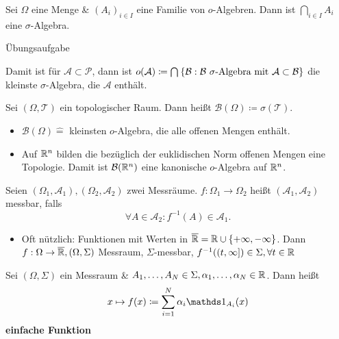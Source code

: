 \begin{lemma}
	Sei $ \Omega $ eine Menge \& $ \left( A_i \right) _{i \in I}  $ eine Familie von $ o $-Algebren.
	Dann ist $ \bigcap_{i \in  I} A_i $ eine $ \sigma $-Algebra.
\end{lemma}
\begin{proof*}
	Übungsaufgabe
\end{proof*}

Damit ist für $ \mathcal{A} \subset \mathcal{P}  $, dann ist $ o(\mathcal{A} ) \coloneqq \bigcap_{} \left\{ \mathcal{B} : \mathcal{B} \text{ $ \sigma $-Algebra mit $ \mathcal{A}  \subset \mathcal{B}  $}  \right\}  $ die kleinste $ \sigma $-Algebra, die $ \mathcal{A}  $ enthält.

\begin{definition}
	Sei $ (\Omega, \mathcal{T} ) $ ein topologischer Raum. Dann heißt $ \mathcal{B} (\Omega) \coloneqq \sigma(\mathcal{T} ) $.
	\begin{itemize}
		\item $ \mathcal{B} (\Omega) \hat{=}  $ kleinsten $ o $-Algebra, die alle offenen Mengen enthält.
		\item Auf $ \mathbb{R} ^n $ bilden die bezüglich der euklidischen Norm offenen Mengen eine Topologie.
			Damit ist $ \mathcal{B} (\mathbb{R} ^n) $ eine kanonische $ o $-Algebra auf $ \mathbb{R} ^n $.
	\end{itemize}
\end{definition}

\begin{definition}
	Seien $ (\Omega_1, \mathcal{A}_1 ), (\Omega_2, \mathcal{A} _2) $ zwei Messräume.
	$ f : \Omega_1 \to \Omega_2 $ heißt $ (\mathcal{A} _1, \mathcal{A} _2) $ messbar, falls
	\[
		\forall A \in \mathcal{A} _2 : f^{-1} (A) \in \mathcal{A} _1.
	\]
	\begin{itemize}
		\item Oft nützlich: Funktionen mit Werten in $ \overline{\mathbb{R} } = \mathbb{R}  \cup \left\{ + \infty, - \infty \right\}  $.
			Dann $ f : \Omega \to \overline{\mathbb{R} }, (\Omega, \Sigma ) $ Messraum,
			$ \Sigma $-messbar, $ f^{-1} ((t, \infty]) \in \Sigma , \forall t \in \mathbb{R}  $
	\end{itemize}
\end{definition}

\begin{example}
	Sei $ (\Omega, \Sigma) $ ein Messraum \& $ A_1, \dotsc, A_N \in \Sigma, \alpha_1, \dotsc, \alpha_N \in \mathbb{R}  $.
	Dann heißt
	\[
		x \mapsto f(x) \coloneqq \sum_{i=1}^{N} \alpha_i \I_{A_i}(x)
	\]
	\textbf{einfache Funktion}
\end{example}

